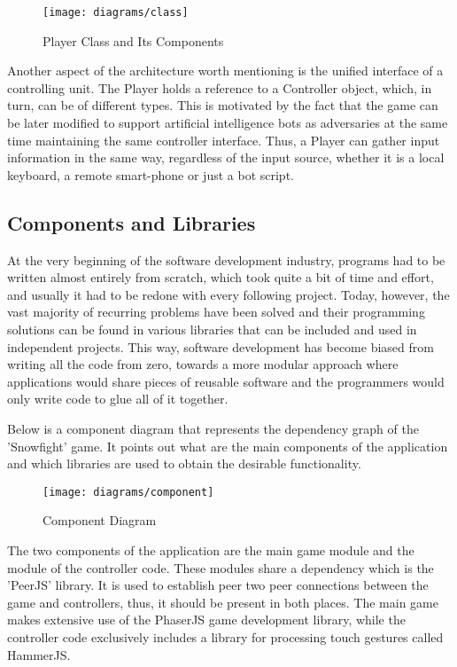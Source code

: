 \begin{figure}[!h]
\centering
\texttt{[image: diagrams/class]}
\caption{Player Class and Its Components}\label{diag:class}
\end{figure}

Another aspect of the architecture worth mentioning is the unified interface of
a controlling unit. The Player holds a reference to a Controller object, which,
in turn, can be of different types. This is motivated by the fact that the game
can be later modified to support artificial intelligence bots as adversaries at
the same time maintaining the same controller interface. Thus, a Player can
gather input information in the same way, regardless of the input source,
whether it is a local keyboard, a remote smart-phone or just a bot script.

\newpage

\subsection{Components and Libraries}

At the very beginning of the software development industry, programs had to be
written almost entirely from scratch, which took quite a bit of time and effort,
and usually it had to be redone with every following project. Today, however,
the vast majority of recurring problems have been solved and their programming
solutions can be found in various libraries that can be included and used in
independent projects. This way, software development has become biased from
writing all the code from zero, towards a more modular approach where
applications would share pieces of reusable software and the programmers would
only write code to glue all of it together.

Below is a component diagram that represents the dependency graph of the
'Snowfight' game. It points out what are the main components of the application
and which libraries are used to obtain the desirable functionality.

\begin{figure}[!h]
\centering
\texttt{[image: diagrams/component]}
\caption{Component Diagram}\label{diag:component}
\end{figure}

The two components of the application are the main game module and the module of
the controller code. These modules share a dependency which is the 'PeerJS'
library. It is used to establish peer two peer connections between the game and
controllers, thus, it should be present in both places. The main game makes
extensive use of the PhaserJS game development library, while the controller
code exclusively includes a library for processing touch gestures called
HammerJS.

